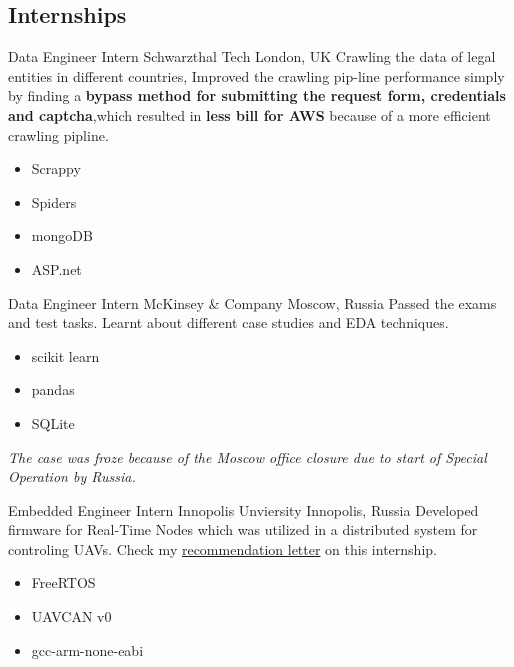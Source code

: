 \vspace{2mm}
\subsection{\Large{Internships}}


                {Data Engineer Intern}
                {Schwarzthal Tech}
                {London, UK}
                {
                \newline
                Crawling the data of legal entities in different countries, Improved the crawling pip-line performance simply by finding a  \textbf{bypass method for submitting the request form, credentials and captcha},which resulted in \textbf{less bill for AWS} because of a more efficient crawling pipline.  } 
                {
                \begin{itemize}
                    \item Scrappy
                    \item Spiders
                    \item mongoDB
                    \item ASP.net 
                \end{itemize}
                }
        
        {Data Engineer Intern}
        {McKinsey \& Company}
        {Moscow, Russia}
        {
        \newline
        Passed the exams and test tasks.
        Learnt about different case studies and EDA techniques.
        } 
        {
        \begin{itemize}
            \item scikit learn
            \item pandas
            \item SQLite
        \end{itemize}
        \textit{The case was froze because of the Moscow office closure due to start of Special Operation by Russia.}
        }
        

        {Embedded Engineer Intern}
        {Innopolis Unviersity}
        {Innopolis, Russia}
        {
        \newline
        Developed firmware for Real-Time Nodes which was utilized in a distributed system for controling UAVs. Check my \href{https://drive.google.com/file/d/1Msw5tk7niDSDpVlNeaLCsUIQxlgREYcV/view?usp=sharing}{\color{blue} recommendation letter} on this internship.
        }
        {
        \begin{itemize}
            \item FreeRTOS
            \item UAVCAN v0
            \item gcc-arm-none-eabi
        \end{itemize}
        }


